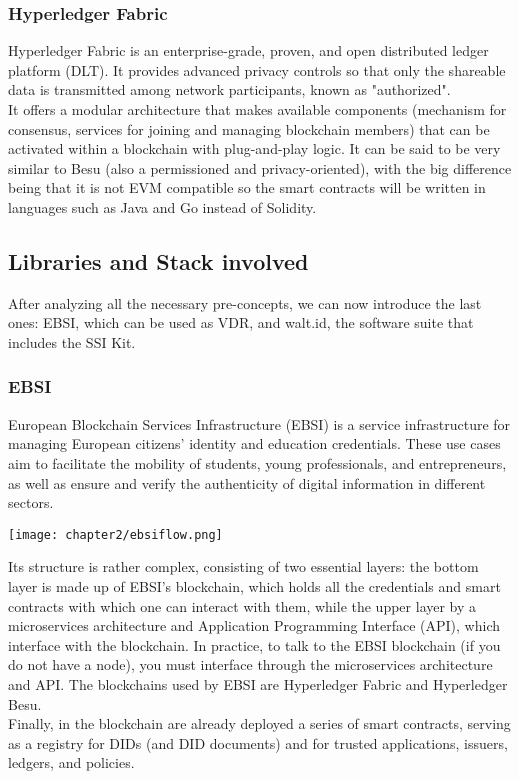\subsubsection{Hyperledger Fabric}
Hyperledger Fabric\cite{site:fabric} is an enterprise-grade, proven, and open distributed ledger 
platform (DLT). It provides advanced privacy controls so that only the shareable 
data is transmitted among network participants, known as "authorized".\\
It offers a modular architecture that makes available components (mechanism for 
consensus, services for joining and managing blockchain members) that can be activated
within a blockchain with plug-and-play logic. It can be said to be very similar to 
Besu (also a permissioned and privacy-oriented), with the big difference being that 
it is not EVM compatible so the smart contracts will be written in languages such as 
Java and Go instead of Solidity.
\subsection{Libraries and Stack involved}
After analyzing all the necessary pre-concepts, we can now introduce the last ones:
EBSI, which can be used as VDR, and walt.id, the software suite that includes the SSI 
Kit.
\subsubsection{EBSI}
European Blockchain Services Infrastructure (EBSI)\cite{site:ebsi} is a service infrastructure for 
managing European citizens' identity and education credentials. These use cases aim 
to facilitate the mobility of students, young professionals, and entrepreneurs, as 
well as ensure and verify the authenticity of digital information in different 
sectors.
\begin{center}
    \texttt{[image: chapter2/ebsiflow.png]}
\end{center}
Its structure is rather complex, consisting of two essential layers: the bottom layer 
is made up of EBSI's blockchain, which holds all the credentials and smart contracts 
with which one can interact with them, while the upper layer by a microservices 
architecture and Application Programming Interface (API), which interface with the 
blockchain. In practice, to talk to the EBSI blockchain (if you do not have a node), 
you must interface through the microservices architecture and API. The blockchains
used by EBSI are Hyperledger Fabric and Hyperledger Besu.\\
Finally, in the blockchain are already deployed a series of smart contracts, serving 
as a registry for DIDs (and DID documents) and for trusted applications, issuers, 
ledgers, and policies.
